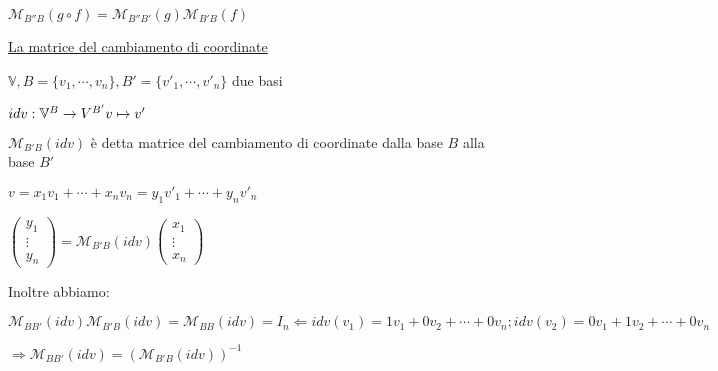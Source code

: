 \documentclass{article}
\newcommand{\ul}[1]{\underline{#1}}
\newcommand{\V}{\mathbb{V}}
\newcommand{\M}{\mathcal{M}}
\begin{document}
$\M_{B''B}(g\circ f)=\M_{B''B'}(g)\M_{B'B}(f)$

\ul{La matrice del cambiamento di coordinate}

$\V, B=\{v_1,\cdots,v_n\}, B'=\{v'_1,\cdots,v'_n\}$ due basi

$idv:\V^B\rightarrow V^{B'}\\v\mapsto v'$

$\M_{B'B}(idv)$ è detta matrice del cambiamento di coordinate dalla base $B$ alla base $B'$

$v=x_1v_1+\cdots+x_nv_n=y_1v'_1+\cdots+y_nv'_n$

$\begin{pmatrix}y_1\\\vdots\\y_n\end{pmatrix}=\M_{B'B}(idv)\begin{pmatrix}x_1\\\vdots\\x_n\end{pmatrix}$

Inoltre abbiamo:

$\M_{BB'}(idv)\M_{B'B}(idv)=\M_{BB}(idv)=I_n\Leftarrow idv(v_1)=1v_1+0v_2+\cdots+0v_n;idv(v_2)=0v_1+1v_2+\cdots+0v_n$

$\Rightarrow\M_{BB'}(idv)=(\M_{B'B}(idv))^{-1}$
\end{document}
